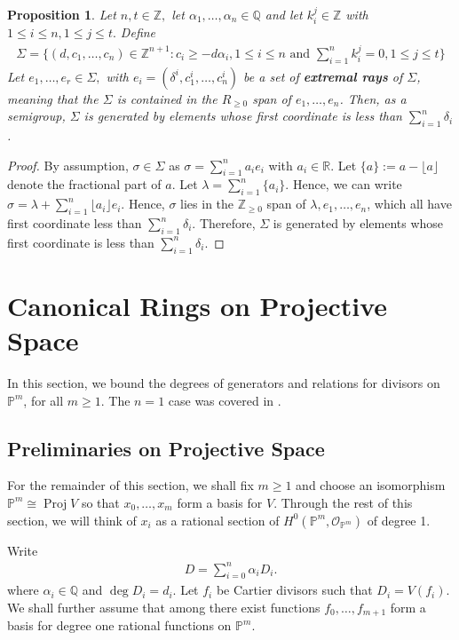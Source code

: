 \documentclass{amsart}
\theoremstyle{plain}
\newtheorem{prop}[thm]{Proposition}
\theoremstyle{definition}
\theoremstyle{remark}
\numberwithin{equation}{section}
\newcommand\ssec{\subsection}
\newcommand\br{{\mathbb R}}
\newcommand\bq{{\mathbb Q}}
\newcommand\bp{{\mathbb P}}
\newcommand\bz{{\mathbb Z}}
\newcommand\sco{{\mathscr O}}
\DeclareMathOperator{\proj}{Proj}
\begin{document}
\begin{prop}
\label{prop:cone-generation}
Let $n,t \in \bz,$ let $\alpha_1, \ldots, \alpha_n \in \bq$ and let $k_i^j \in \bz$ with $1 \leq i \leq n, 1 \leq j \leq t.$ Define
\begin{align*}
	\Sigma = \{(d,c_1, \ldots, c_n) \in \bz^{n+1} : c_i \geq - d \alpha_i,1 \leq i \leq n \text{ and } \sum_{i=1}^{n}k_i^j = 0, 1 \leq j \leq t\}
\end{align*}
Let $e_1, \ldots, e_r \in \Sigma,$ with $e_i = (\delta^i, c_1^i, \ldots, c_n^i)$ be a set of {\bf extremal rays} of $\Sigma$, meaning that the $\Sigma$ is contained in the $R_{\geq 0}$ span of $e_1, \ldots, e_n$.  Then, as a semigroup, $\Sigma$ is generated by elements whose first coordinate is less than $\sum_{i=1}^{n}\delta_i$.
\end{prop}
\begin{proof}
By assumption, $\sigma \in \Sigma$ as $\sigma = \sum_{i=1}^{n}a_i e_i$ with $a_i \in \br$. Let $\{a\} := a - \lfloor a \rfloor$ denote the fractional part of $a$. Let $\lambda = \sum_{i=1}^{n}\{a_i\}$. Hence, we can write $\sigma = \lambda + \sum_{i=1}^{n}\lfloor a_i \rfloor e_i.$ Hence, $\sigma$ lies in the $\bz_{\geq 0}$ span of $\lambda, e_1,\ldots, e_n$, which all have first coordinate less than $\sum_{i=1}^{n}\delta_i$. Therefore, $\Sigma$ is generated by elements whose first coordinate is less than $\sum_{i=1}^{n}\delta_i$.
\end{proof}




\section{Canonical Rings on Projective Space}
In this section, we bound the degrees of generators and relations for divisors on $\bp^m$, for all $m \geq 1$. The $n = 1$ case was covered in \cite{dorney:canonical}.

\ssec{Preliminaries on Projective Space}

For the remainder of this section, we shall fix $m \geq 1$ and choose an isomorphism $\bp^m \cong \proj V$ so that $x_0,\ldots, x_m$ form a basis for $V$. Through the rest of this section, we will think of $x_i$ as a rational section of $H^0(\bp^m, \sco_{\bp^m})$ of degree 1.


Write
\begin{align*}
	D = \sum_{i=0}^{n}\alpha_i D_i.
\end{align*}
where $\alpha_i \in \bq$ and $\deg D_i = d_i$. Let $f_i$ be Cartier divisors such that $D_i = V(f_i)$. We shall further assume that among there exist functions $f_0,\ldots, f_{m+1}$ form a basis for degree one rational functions on $\bp^m$.
\end{document}
